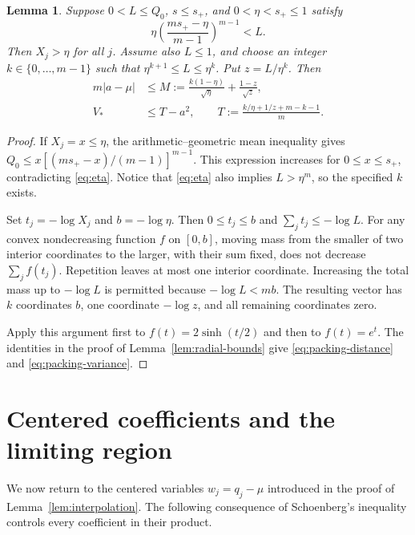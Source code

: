 \documentclass[11pt,reqno]{amsart}
\newtheorem{lem}[thm]{Lemma}
\theoremstyle{definition}
\theoremstyle{remark}
\numberwithin{equation}{section}
\begin{document}
\begin{lem}\label{lem:packing}
Suppose $0<L\le Q_0$, $s\le s_+$, and $0<\eta<s_+\le1$ satisfy
\begin{equation}\label{eq:eta}
 \eta\left(\frac{ms_+-\eta}{m-1}\right)^{m-1}<L.
\end{equation}
Then $X_j>\eta$ for all $j$. Assume also $L\le1$, and choose an integer $k\in\{0,\ldots,m-1\}$ such that $\eta^{k+1}\le L\le\eta^k$. Put $z=L/\eta^k$. Then
\begin{align}
 m|a-\mu|&\le M:=\frac{k(1-\eta)}{\sqrt\eta}+\frac{1-z}{\sqrt z},\label{eq:packing-distance}\\
 V_*&\le T-a^2,\qquad
 T:=\frac{k/\eta+1/z+m-k-1}{m}.\label{eq:packing-variance}
\end{align}
\end{lem}
\begin{proof}
If $X_j=x\le\eta$, the arithmetic--geometric mean inequality gives
$Q_0\le x[(ms_+-x)/(m-1)]^{m-1}$.
This expression increases for $0\le x\le s_+$, contradicting \eqref{eq:eta}. Notice that \eqref{eq:eta} also implies $L>\eta^m$, so the specified $k$ exists.

Set $t_j=-\log X_j$ and $b=-\log\eta$. Then $0\le t_j\le b$ and $\sum_jt_j\le-\log L$. For any convex nondecreasing function $f$ on $[0,b]$, moving mass from the smaller of two interior coordinates to the larger, with their sum fixed, does not decrease $\sum_jf(t_j)$. Repetition leaves at most one interior coordinate. Increasing the total mass up to $-\log L$ is permitted because $-\log L<mb$. The resulting vector has $k$ coordinates $b$, one coordinate $-\log z$, and all remaining coordinates zero.

Apply this argument first to $f(t)=2\sinh(t/2)$ and then to $f(t)=e^t$. The identities in the proof of Lemma~\ref{lem:radial-bounds} give \eqref{eq:packing-distance} and \eqref{eq:packing-variance}.
\end{proof}

\section{Centered coefficients and the limiting region}\label{sec:coefficients}

We now return to the centered variables $w_j=q_j-\mu$ introduced in the proof of Lemma~\ref{lem:interpolation}. The following consequence of Schoenberg's inequality controls every coefficient in their product.
\end{document}
